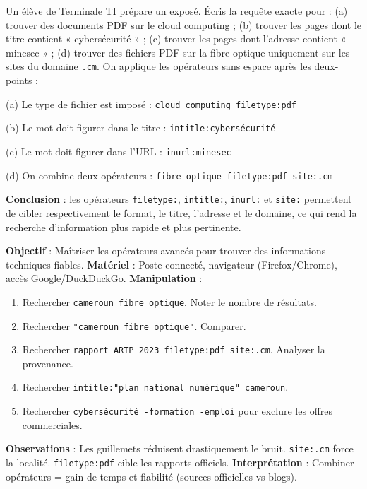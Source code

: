 \documentclass[11pt]{article}
\begin{document}
\begin{exoresolu}
Un élève de Terminale TI prépare un exposé. Écris la requête exacte pour : 
(a) trouver des documents PDF sur le cloud computing ; 
(b) trouver les pages dont le titre contient « cybersécurité » ; 
(c) trouver les pages dont l'adresse contient « minesec » ; 
(d) trouver des fichiers PDF sur la fibre optique uniquement sur les sites du domaine \texttt{.cm}.
\tcblower
On applique les opérateurs sans espace après les deux-points :

(a) Le type de fichier est imposé : \texttt{cloud computing filetype:pdf}

(b) Le mot doit figurer dans le titre : \texttt{intitle:cybersécurité}

(c) Le mot doit figurer dans l'URL : \texttt{inurl:minesec}

(d) On combine deux opérateurs : \texttt{fibre optique filetype:pdf site:.cm}

\textbf{Conclusion} : les opérateurs \texttt{filetype:}, \texttt{intitle:}, \texttt{inurl:} et \texttt{site:} permettent de cibler respectivement le format, le titre, l'adresse et le domaine, ce qui rend la recherche d'information plus rapide et plus pertinente.
\end{exoresolu}

\begin{experience}
\textbf{Objectif} : Maîtriser les opérateurs avancés pour trouver des informations techniques fiables.
\textbf{Matériel} : Poste connecté, navigateur (Firefox/Chrome), accès Google/DuckDuckGo.
\textbf{Manipulation} :
\begin{enumerate}
\item Rechercher \texttt{cameroun fibre optique}. Noter le nombre de résultats.
\item Rechercher \texttt{"cameroun fibre optique"}. Comparer.
\item Rechercher \texttt{rapport ARTP 2023 filetype:pdf site:.cm}. Analyser la provenance.
\item Rechercher \texttt{intitle:"plan national numérique" cameroun}. 
\item Rechercher \texttt{cybersécurité -formation -emploi} pour exclure les offres commerciales.
\end{enumerate}
\textbf{Observations} : Les guillemets réduisent drastiquement le bruit. \texttt{site:.cm} force la localité. \texttt{filetype:pdf} cible les rapports officiels.
\textbf{Interprétation} : Combiner opérateurs = gain de temps et fiabilité (sources officielles vs blogs).
\end{experience}
\end{document}
